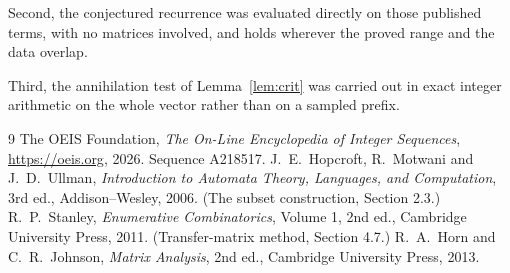 \documentclass[11pt,a4paper]{article}
\theoremstyle{plain}
\theoremstyle{definition}
\begin{document}
Second, the conjectured recurrence was evaluated directly on those published terms, with no
matrices involved, and holds wherever the proved range and the data overlap.

Third, the annihilation test of Lemma~\ref{lem:crit} was carried out in exact integer
arithmetic on the whole vector rather than on a sampled prefix.

\begin{thebibliography}{9}
 The OEIS Foundation, \emph{The On-Line Encyclopedia of Integer
Sequences}, \url{https://oeis.org}, 2026. Sequence A218517.
 J.~E.~Hopcroft, R.~Motwani and J.~D.~Ullman, \emph{Introduction to Automata
Theory, Languages, and Computation}, 3rd ed., Addison--Wesley, 2006. (The subset
construction, Section 2.3.)
 R.~P.~Stanley, \emph{Enumerative Combinatorics}, Volume 1, 2nd ed.,
Cambridge University Press, 2011. (Transfer-matrix method, Section 4.7.)
 R.~A.~Horn and C.~R.~Johnson, \emph{Matrix Analysis}, 2nd ed., Cambridge
University Press, 2013.
\end{thebibliography}
\end{document}
